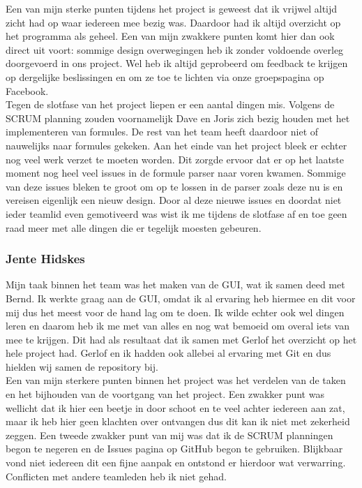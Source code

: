 \documentclass[a4paper,11pt]{article}
\begin{document}
Een van mijn sterke punten tijdens het project is geweest dat ik vrijwel altijd zicht had op waar iedereen mee bezig was. Daardoor had ik altijd overzicht op het programma als geheel. Een van mijn zwakkere punten komt hier dan ook direct uit voort: sommige design overwegingen heb ik zonder voldoende overleg doorgevoerd in ons project. Wel heb ik altijd geprobeerd om feedback te krijgen op dergelijke beslissingen en om ze toe te lichten via onze groepspagina op Facebook.\\

Tegen de slotfase van het project liepen er een aantal dingen mis. Volgens de SCRUM planning zouden voornamelijk Dave en Joris zich bezig houden met het implementeren van formules. De rest van het team heeft daardoor niet of nauwelijks naar formules gekeken. Aan het einde van het project bleek er echter nog veel werk verzet te moeten worden. Dit zorgde ervoor dat er op het laatste moment nog heel veel issues in de formule parser naar voren kwamen. Sommige van deze issues bleken te groot om op te lossen in de parser zoals deze nu is en vereisen eigenlijk een nieuw design. Door al deze nieuwe issues en doordat niet ieder teamlid even gemotiveerd was wist ik me tijdens de slotfase af en toe geen raad meer met alle dingen die er tegelijk moesten gebeuren.
\subsubsection{Jente Hidskes}
Mijn taak binnen het team was het maken van de GUI, wat ik samen deed met Bernd. Ik werkte graag aan de GUI, omdat ik al ervaring heb hiermee en dit voor mij dus het meest voor de hand lag om te doen. Ik wilde echter ook wel dingen leren en daarom heb ik me met van alles en nog wat bemoeid om overal iets van mee te krijgen. Dit had als resultaat dat ik samen met Gerlof het overzicht op het hele project had. Gerlof en ik hadden ook allebei al ervaring met Git en dus hielden wij samen de repository bij.\\
Een van mijn sterkere punten binnen het project was het verdelen van de taken en het bijhouden van de voortgang van het project. Een zwakker punt was wellicht dat ik hier een beetje in door schoot en te veel achter iedereen aan zat, maar ik heb hier geen klachten over ontvangen dus dit kan ik niet met zekerheid zeggen. Een tweede zwakker punt van mij was dat ik de SCRUM planningen begon te negeren en de Issues pagina op GitHub begon te gebruiken. Blijkbaar vond niet iedereen dit een fijne aanpak en ontstond er hierdoor wat verwarring. Conflicten met andere teamleden heb ik niet gehad.
\end{document}
